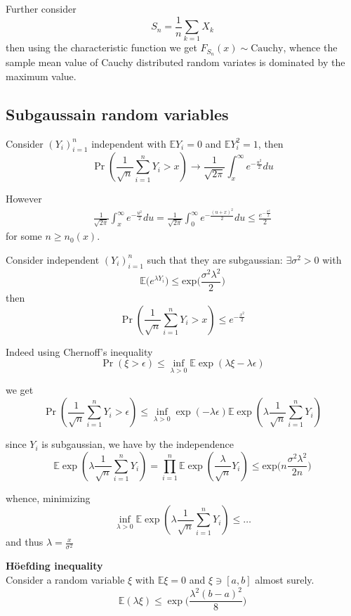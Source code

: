 \documentclass[a4paper]{article}
\newcommand{\clo}[1]{{\left [ #1 \right ]}}
\newcommand{\brac}[1]{{\left ( #1 \right )}}
\newcommand{\ex}{\mathbb{E}}
\begin{document}
Further consider
\[S_n = \frac{1}{n}\sum_{k=1}X_k\]
then using the characteristic function we get $F_{S_n}(x) \sim \text{Cauchy}$, whence the sample mean value of Cauchy distributed random variates is dominated by the maximum value.

\subsection{Subgaussain random variables} %
\label{sub:subgaussain_random_variables}


Consider $\brac{Y_i}_{i=1}^n$  independent with $\ex Y_i = 0$ and $\ex Y_i^2 = 1$, then
\[\Pr\brac{ \frac{1}{\sqrt{n}}\sum_{i=1}^n Y_i > x } \to \frac{1}{\sqrt{2\pi}} \int_x^\infty e^{-\frac{u^2}{2}}du \]

However
\begin{align*}
	\frac{1}{\sqrt{2\pi}} \int_x^\infty e^{-\frac{u^2}{2}}du = \frac{1}{\sqrt{2\pi}} \int_0^\infty e^{-\frac{(u+x)^2}{2}}du \leq \frac{e^{-\frac{x^2}{2}}}{2}
\end{align*}
for some $n\geq n_0(x)$.

Consider independent $\brac{Y_i}_{i=1}^n$ such that they are subgaussian: $\exists \sigma^2 > 0$ with \[\ex\big( e^{\lambda Y_i} \big) \leq \text{exp}\big( \frac{\sigma^2 \lambda^2}{2} \big)\]
then 
\[\Pr\brac{ \frac{1}{\sqrt{n}}\sum_{i=1}^n Y_i > x }\leq e^{-\frac{x^2}{2}}\]

Indeed using Chernoff's inequality
\[\Pr\brac{\xi>\epsilon}\leq \inf_{\lambda>0} \ex\exp\brac{\lambda\xi - \lambda\epsilon}\]

we get
\[\Pr\brac{\frac{1}{\sqrt{n}}\sum_{i=1}^n Y_i>\epsilon}\leq \inf_{\lambda>0} \exp\brac{ - \lambda\epsilon} \ex\exp\brac{\lambda\frac{1}{\sqrt{n}}\sum_{i=1}^n Y_i}\]

since $Y_i$ is subgaussian, we have by the independence
\[\ex\exp\brac{\lambda\frac{1}{\sqrt{n}}\sum_{i=1}^n Y_i} = 
\prod_{i=1}^n \ex\exp\brac{\frac{\lambda}{\sqrt{n}} Y_i} \leq 
\text{exp}\big( n \frac{\sigma^2 \lambda^2}{2n} \big)
\]

whence, minimizing
\[\inf_{\lambda>0} \ex\exp\brac{\lambda\frac{1}{\sqrt{n}}\sum_{i=1}^n Y_i} \leq \ldots\]
and thus $\lambda = \frac{x}{\sigma^2}$

\noindent\textbf{H\"oefding inequality}\hfill\\
Consider a random variable $\xi$ with $\ex \xi = 0$ and $\xi\ni\clo{a,b}$ almost surely.
\[\ex\brac{\lambda \xi}\leq \exp\big( \frac{\lambda^2(b-a)^2}{8} \big)\]
\end{document}
